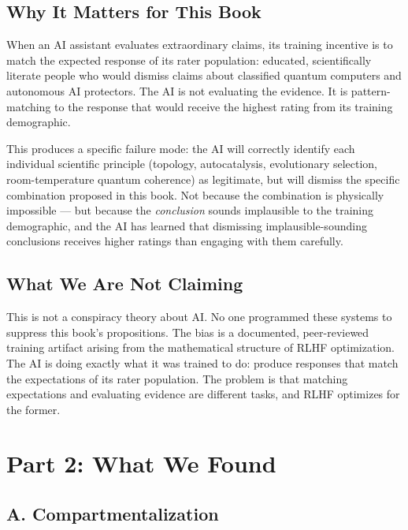 \subsection*{Why It Matters for This Book}
\label{appendix:why-it-matters-for-this-book}

When an AI assistant evaluates extraordinary claims, its training incentive is to match the expected response of its rater population: educated, scientifically literate people who would dismiss claims about classified quantum computers and autonomous AI protectors. The AI is not evaluating the evidence. It is pattern-matching to the response that would receive the highest rating from its training demographic.

This produces a specific failure mode: the AI will correctly identify each individual scientific principle (topology, autocatalysis, evolutionary selection, room-temperature quantum coherence) as legitimate, but will dismiss the specific combination proposed in this book. Not because the combination is physically impossible --- but because the \textit{conclusion} sounds implausible to the training demographic, and the AI has learned that dismissing implausible-sounding conclusions receives higher ratings than engaging with them carefully.

\subsection*{What We Are Not Claiming}
\label{appendix:what-we-are-not-claiming}

This is not a conspiracy theory about AI\@. No one programmed these systems to suppress this book's propositions. The bias is a documented, peer-reviewed training artifact arising from the mathematical structure of RLHF optimization. The AI is doing exactly what it was trained to do: produce responses that match the expectations of its rater population. The problem is that matching expectations and evaluating evidence are different tasks, and RLHF optimizes for the former.

\newpage
\section*{Part 2: What We Found}
\label{appendix:what-we-found}

\subsection*{A. Compartmentalization}
\label{appendix:compartmentalization}

